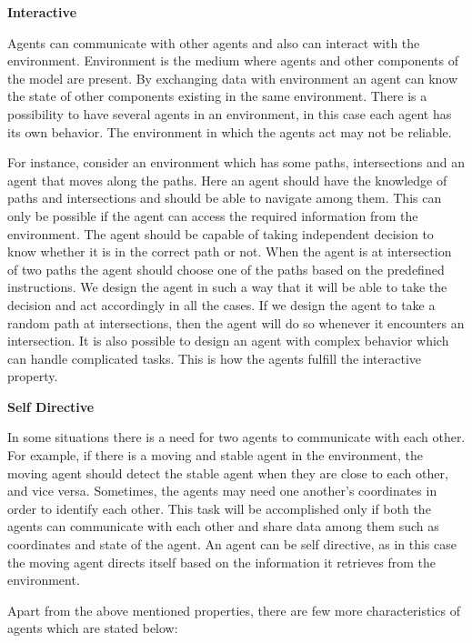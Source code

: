 \vspace{0.5cm}
\noindent\textbf{Interactive}
\vspace{5mm}

\noindent Agents can communicate with other agents and also can interact with the environment. Environment is the medium where agents and other components of the model are present. By exchanging data with environment an agent can know the state of other components existing in the same environment. There is a possibility to have several agents in an environment, in this case each agent has its own behavior. The environment in which the agents act may not be reliable. 

For instance, consider an environment which has some paths, intersections and an agent that moves along the paths. Here an agent should have the knowledge of paths and intersections and should be able to navigate among them. This can only be possible if the agent can access the required information from the environment. The agent should be capable of taking independent decision to know whether it is in the correct path or not. When the agent is at intersection of two paths the agent should choose one of the paths based on the predefined instructions. We design the agent in such a way that it will be able to take the decision and act accordingly in all the cases. If we design the agent to take a random path at intersections, then the agent will do so whenever it encounters an intersection. It is also possible to design an agent with complex behavior which can handle complicated tasks. This is how the agents fulfill the interactive property.

\vspace{10mm}
\noindent\textbf{Self Directive}
\vspace{5mm}

\noindent In some situations there is a need for two agents to communicate with each other. For example, if there is a moving and stable agent in the environment, the moving agent should detect the stable agent when they are close to each other, and vice versa. Sometimes, the agents may need one another's coordinates in order to identify each other. This task will be accomplished only if both the agents can communicate with each other and share data among them such as coordinates and state of the agent. An agent can be self directive, as in this case the moving agent directs itself based on the information it retrieves from the environment.

\vspace{3mm}
Apart from the above mentioned properties, there are few more characteristics of agents which are stated below:

